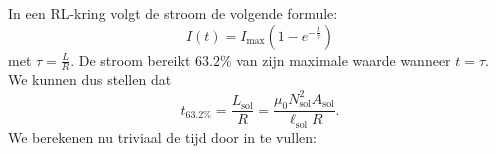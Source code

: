 \begin{enumerate}[(a)]
\begin{description}[labelwidth=1.5cm, leftmargin=!]
                In een RL-kring volgt de stroom de volgende formule:
                \begin{equation*}
                    I(t) = I_{\text{max}} \left( 1 - e^{-\frac{t}{\tau}} \right)
                \end{equation*}
                met $\tau = \frac{L}{R}$. De stroom bereikt $63.2\%$ van zijn maximale waarde wanneer $t = \tau $. We kunnen dus stellen dat
                \begin{equation*}
                    t_{63.2\%} = \frac{L_{{\text{sol}}}}{R} = \frac{\mu_0N_{{\text{sol}}}^2A_{{\text{sol}}}}{\ell_{{\text{sol}}}R}.
                \end{equation*}
                We berekenen nu triviaal de tijd door in te vullen:

\end{description}
\end{enumerate}
